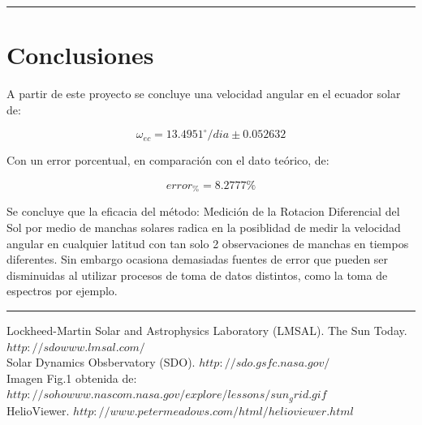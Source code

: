 \documentclass[11pt,letterpaper]{article}
\begin{document}
\hrule

\section{Conclusiones}

A partir de este proyecto se concluye una velocidad angular en el ecuador solar de:

\begin{equation*}
\omega_{ec} =  13.4951^{\circ}\mathrm{}/dia \pm 0.052632
\end{equation*}

Con un error porcentual, en comparación con el dato teórico, de:

\begin{equation*}
error_{\%} =  8.2777 \%
\end{equation*}

Se concluye que la eficacia del método: Medición de la Rotacion Diferencial del Sol por medio de manchas solares radica en la posiblidad de medir la velocidad angular en cualquier latitud con tan solo 2 observaciones de manchas en tiempos diferentes. Sin embargo ocasiona demasiadas fuentes de error que pueden ser disminuidas al utilizar procesos de toma de datos distintos, como la toma de espectros por ejemplo. 
\\

\hrule





Lockheed-Martin Solar and Astrophysics Laboratory (LMSAL). The Sun Today.  \href{http://sdowww.lmsal.com/}{$http://sdowww.lmsal.com/$}
\\

Solar Dynamics Obsbervatory (SDO). \href{http://sdo.gsfc.nasa.gov/}{$http://sdo.gsfc.nasa.gov/$}
\\

Imagen Fig.1 obtenida de:
\href{http://sohowww.nascom.nasa.gov/explore/lessons/sun_grid.gif}{$http://sohowww.nascom.nasa.gov/explore/lessons/sun_grid.gif$}
\\

HelioViewer. \href{http://www.petermeadows.com/html/helioviewer.html}{$http://www.petermeadows.com/html/helioviewer.html$}
\\
\end{document}
